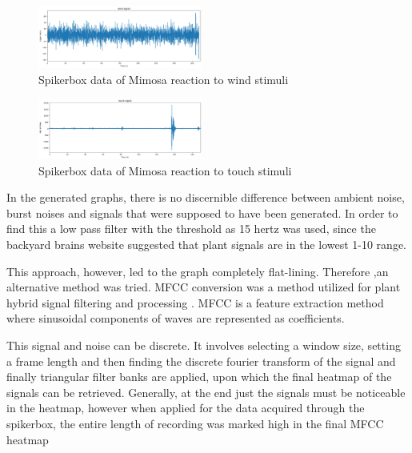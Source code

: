 \documentclass[conference]{IEEEtran}
\begin{document}
\begin{figure}[H]
    \begin{center}
        \includegraphics[width=0.48\textwidth]{wind}
    \end{center}
    \vspace{-\baselineskip}
    \caption{Spikerbox data of Mimosa reaction to wind stimuli}\label{fig:wind}
\end{figure}

\begin{figure}[H]
    \begin{center}
        \includegraphics[width=0.48\textwidth]{touch}
    \end{center}
    \vspace{-\baselineskip}
    \caption{Spikerbox data of Mimosa reaction to touch stimuli}\label{fig:touch}
\end{figure}


In the generated graphs, there is no discernible difference between 
ambient noise, burst noises and signals that were supposed to have been 
generated. In order to find this a low pass filter with the threshold as 
15 hertz was used, since the backyard brains website suggested that plant
signals are in the lowest 1-10 range. 

This approach, however, led to the graph completely flat-lining. Therefore
,an alternative method was tried. MFCC conversion was a method utilized for
plant hybrid signal filtering and processing \cite{duerr2020}. MFCC is a feature extraction 
method where sinusoidal components of waves are represented as coefficients.

This signal and noise can be discrete. It involves selecting a window
size, setting a frame length and then finding the discrete fourier
transform of the signal and finally triangular filter banks are applied, 
upon which the final heatmap of the signals can be retrieved. Generally, 
at the end just the signals must be noticeable in the heatmap, however
when applied for the data acquired through the spikerbox, the entire 
length of recording was marked high in the final MFCC heatmap
\end{document}
